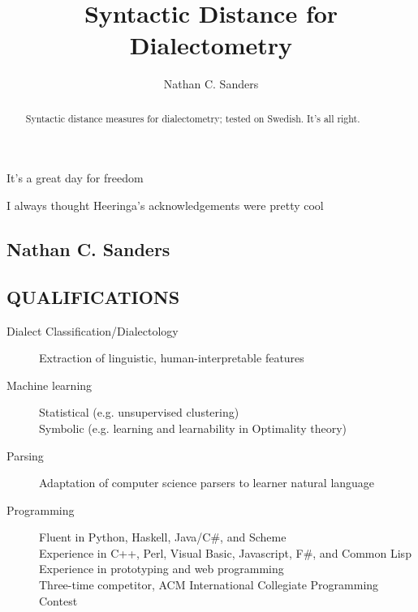 \documentclass{iuthesis}
\title{Syntactic Distance for Dialectometry}
\author{Nathan C. Sanders}
\begin{document}
\begin{dedication}
  It's a great day for freedom
\end{dedication}
\begin{acknowledgements}
  I always thought Heeringa's acknowledgements were
  pretty cool
\end{acknowledgements}
\begin{abstract}
  Syntactic distance measures for dialectometry; tested on
  Swedish. It's all right.
\end{abstract}

\frontmatter
\maketitle
\signaturepage
\copyrightpage
\makededication
\makeack
\makeabstract
\tableofcontents
\mainmatter











\backmatter

\begin{center}
\section*{Nathan C. Sanders}
\end{center}

\subsection*{QUALIFICATIONS}
\begin{description}
  \item[Dialect Classification/Dialectology] Extraction of
    linguistic, human-interpretable features
  \item[Machine learning] Statistical (e.g. unsupervised clustering) \\
    Symbolic (e.g. learning and learnability in Optimality theory)
  \item[Parsing] Adaptation of computer science parsers to learner
    natural language
  \item[Programming] Fluent in Python, Haskell, Java/C\#, and Scheme \\
    Experience in C++, Perl, Visual Basic, Javascript, F\#, and
    Common Lisp \\
    Experience in prototyping and web programming \\
    Three-time competitor, ACM International Collegiate Programming
    Contest
\end{description}
\end{document}
